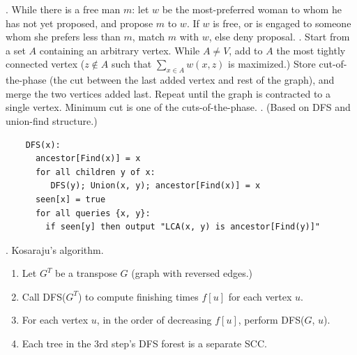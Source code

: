 .
While there is a free man $m$: let $w$ be the most-preferred woman to whom he
has not yet proposed, and propose $m$ to $w$. If $w$ is free, or is engaged to someone whom
she prefers less than $m$, match $m$ with $w$, else deny proposal. \TopicBreak
{}.
Start from a set $A$ containing an arbitrary vertex.
While $A \ne V$, add to $A$ the most tightly connected vertex
($z \notin A$ such that $\sum_{x \in A} w(x, z)$ is maximized.)
Store cut-of-the-phase (the cut between the last added vertex and rest of
the graph), and merge the two vertices added last.  Repeat until the graph
is contracted to a single vertex.  Minimum cut is one of the cuts-of-the-phase. \TopicBreak
{}. (Based on DFS and union-find structure.)
\begin{verbatim}
    DFS(x):
      ancestor[Find(x)] = x
      for all children y of x:
         DFS(y); Union(x, y); ancestor[Find(x)] = x
      seen[x] = true
      for all queries {x, y}:
        if seen[y] then output "LCA(x, y) is ancestor[Find(y)]"
\end{verbatim}
. Kosaraju's algorithm.
\begin{enumerate}
    \item Let $G^T$ be a transpose $G$ (graph with reversed edges.) \\
    \item Call DFS($G^T$) to compute finishing times $f[u]$ for each vertex $u$. \\
    \item For each vertex $u$, in the order of decreasing $f[u]$, perform DFS($G$, $u$). \\
    \item Each tree in the 3rd step's DFS forest is a separate SCC.
\end{enumerate}
